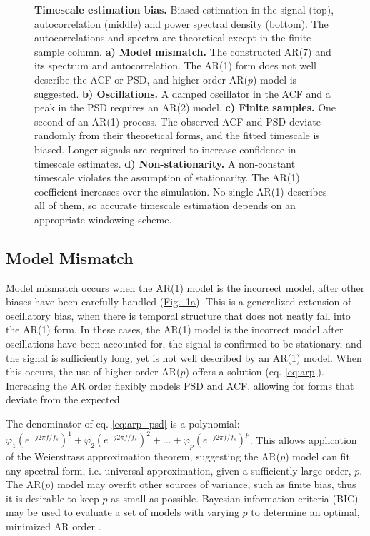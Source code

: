 \documentclass[pdflatex,sn-mathphys-num]{sn-jnl}
\newcommand{\figpanel}[2]{\hyperref[#1]{Fig.~\ref*{#1}#2}}
\begin{document}
\begin{figure}[htbp]
  \centering
  
  \caption{\textbf{Timescale estimation bias.} Biased estimation in the signal (top), autocorrelation (middle) and power spectral density (bottom). The autocorrelations and spectra are theoretical except in the finite-sample column. \textbf{a) Model mismatch.} The constructed AR(7) and its spectrum and autocorrelation. The AR(1) form does not well describe the ACF or PSD, and higher order AR($p$) model is suggested. \textbf{b) Oscillations.} A damped oscillator in the ACF and a peak in the PSD requires an AR(2) model. \textbf{c) Finite samples.} One second of an AR(1) process. The observed ACF and PSD deviate randomly from their theoretical forms, and the fitted timescale is biased. Longer signals are required to increase confidence in timescale estimates. \textbf{d) Non-stationarity.} A non-constant timescale violates the assumption of stationarity. The AR(1) coefficient increases over the simulation.  No single AR(1) describes all of them, so accurate timescale estimation depends on an appropriate windowing scheme.}
  \label{fig:bias}
\end{figure}

\subsection{Model Mismatch}

Model mismatch occurs when the AR(1) model is the incorrect model, after other biases have been carefully handled (\figpanel{fig:bias}{a}). This is a generalized extension of oscillatory bias, when there is temporal structure that does not neatly fall into the AR(1) form. In these cases, the AR(1) model is the incorrect model after oscillations have been accounted for, the signal is confirmed to be stationary, and the signal is sufficiently long, yet is not well described by an AR(1) model. When this occurs, the use of higher order AR($p$) offers a solution (eq. \ref{eq:arp}). Increasing the AR order flexibly models PSD and ACF, allowing for forms that deviate from the expected.

The denominator of eq. \ref{eq:arp_psd} is a polynomial: $\varphi_1 (e^{-j 2 \pi f / f_s})^1 + \varphi_2 (e^{-j 2 \pi f / f_s})^2 + \dots + \varphi_p (e^{-j 2 \pi f / f_s})^p$. This allows application of the Weierstrass approximation theorem, suggesting the AR($p$) model can fit any spectral form, i.e. universal approximation, given a sufficiently large order, $p$. The AR($p$) model may overfit other sources of variance, such as finite bias, thus it is desirable to keep $p$ as small as possible. Bayesian information criteria (BIC) may be used to evaluate a set of models with varying $p$ to determine an optimal, minimized AR order \cite{schwarz_estimating_1978, vidaurre_survey_2013}.
\end{document}
